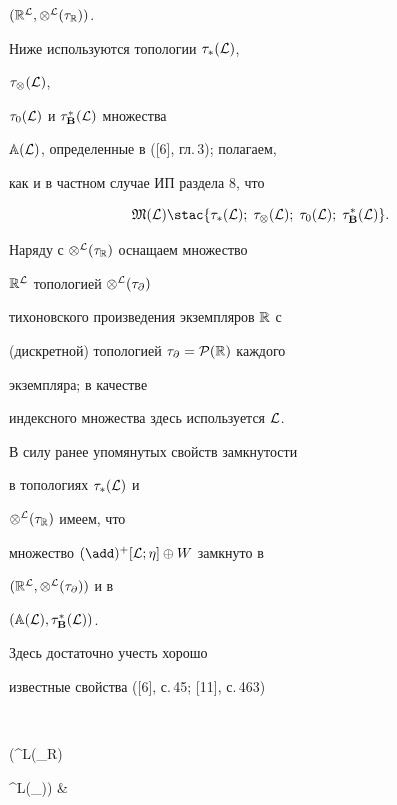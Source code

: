 $({{\Bbb R}^{\cal L}},{{\otimes}^{\cal L}}({\tau}_{\Bbb R}))$.





Ниже используются топологии ${{\tau}_*}({\cal L})$,


${{\tau}_\otimes}({\cal L})$,


${{\tau}_0}({\cal L})$ и ${{\tau}_{\bold B}^*}({\cal L})$ множества


${\Bbb A}({\cal L})$, определенные в ([6], гл.\,3); полагаем,


как и в частном случае ИП раздела 8, что


$$


{\frak M}({\cal L}) \stac \{{{\tau}_*}({\cal L});\;


{{\tau}_\otimes}({\cal L});\;{{\tau}_0}({\cal L});\;


{{\tau}_{\bold B}^*}({\cal L})\}.


$$





Наряду с ${{\otimes}^{\cal L}}({\tau}_{\Bbb R})$ оснащаем множество


${\Bbb R}^{\cal L}$ топологией ${{\otimes}^{\cal L}}({\tau}_\partial)$


тихоновского произведения экземпляров ${\Bbb R}$ с


(дискретной) топологией ${{\tau}_\partial} = {{\cal P}({\Bbb R})}$ каждого


экземпляра; в качестве


индексного множества здесь используется ${\cal L}$.


В силу ранее упомянутых свойств замкнутости


в топологиях ${{\tau}_*}({\cal L})$ и


${{\otimes}^{\cal L}}({\tau}_{\Bbb R})$ имеем, что


множество ${(\add)^+}[{\cal L};\eta] \oplus W$ замкнуто в


$({{\Bbb R}^{\cal L}},{{\otimes}^{\cal L}}({\tau}_\partial))$ и в


$({{\Bbb A}({\cal L})},{{\tau}_{\bold B}^*}({\cal L}))$.


Здесь достаточно учесть хорошо


известные свойства ([6], с.\,45; [11], с.\,463)


$$


({{\otimes}^{\cal L}}({\tau}_{\Bbb R}) \subset


{{\otimes}^{\cal L}}({\tau}_\partial)) \&


